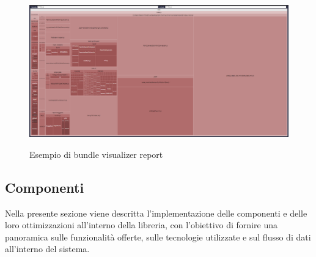\begin{figure}[H]
    \centering
    \includegraphics[alt={Esempio di bundle visualizer report}, width=1 \columnwidth]{img/bundle-visualizer.png}
    \caption{Esempio di bundle visualizer report}
    \label{fig:bundle-visualizer}
\end{figure}

\subsection{Componenti}
Nella presente sezione viene descritta l'implementazione delle componenti e delle loro ottimizzazioni all'interno della libreria,
con l'obiettivo di fornire una panoramica sulle funzionalità offerte, sulle tecnologie utilizzate e sul flusso di dati all'interno del sistema.

